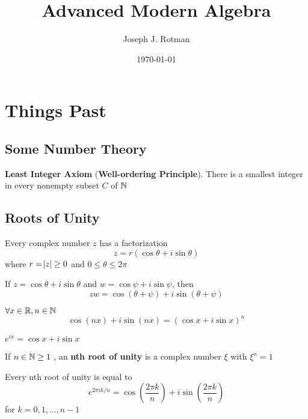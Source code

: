 \documentclass[11pt]{article}
\author{Joseph J. Rotman}
\date{\today}
\title{Advanced Modern Algebra}
\begin{document}
\maketitle
\tableofcontents \clearpage\section{Things Past}
\label{sec:org1ce9e42}
\subsection{Some Number Theory}
\label{sec:org73c414a}
\textbf{Least Integer Axiom} (\textbf{Well-ordering Principle}). There is a smallest integer in
every nonempty subset \(C\) of \(\mathbb{N}\)
\subsection{Roots of Unity}
\label{sec:orga3bf812}
\begin{proposition}
Every complex number \(z\) has a factorization
\begin{equation*}
z=r(\cos\theta+i\sin\theta)
\end{equation*}
where \(r=\abs{z}\ge0\) and \(0\le\theta\le 2\pi\)
\end{proposition}

\begin{proposition}
If \(z=\cos\theta+i\sin\theta\) and \(w=\cos\psi+i\sin\psi\), then
\begin{equation*}
zw=\cos(\theta+\psi)+i\sin(\theta+\psi)
\end{equation*}
\end{proposition}

\begin{theorem}[De Moivre]
\(\forall x\in\mathbb{R},n\in\mathbb{N}\)
\begin{equation*}
\cos(nx)+i\sin(nx)=(\cos x+i\sin x)^n
\end{equation*}
\end{theorem}

\begin{theorem}[Euler]
\(e^{ix}=\cos x+i\sin x\)
\end{theorem}

\begin{definition}[]
If \(n\in\mathbb{N}\ge 1\) , an \textbf{nth root of unity} is a complex number \(\xi\) with
\(\xi^n=1\)
\end{definition}

\begin{corollary}[]
Every nth root of unity is equal to
\begin{equation*}
e^{2\pi ik/n}=\cos(\frac{2\pi k}{n})+i\sin(\frac{2\pi k}{n})
\end{equation*}
for \(k=0,1,\dots,n-1\)
\end{corollary}
\end{document}
